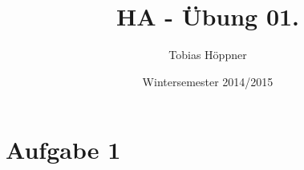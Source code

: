 \documentclass[ngerman,a4paper]{report}
\author{Tobias Höppner}
\title{HA - Übung 01. }
\date{Wintersemester 2014/2015}
\renewcommand{\maketitle}{}
\begin{document}
 
\maketitle 
\section*{Aufgabe 1}
\end{document}
